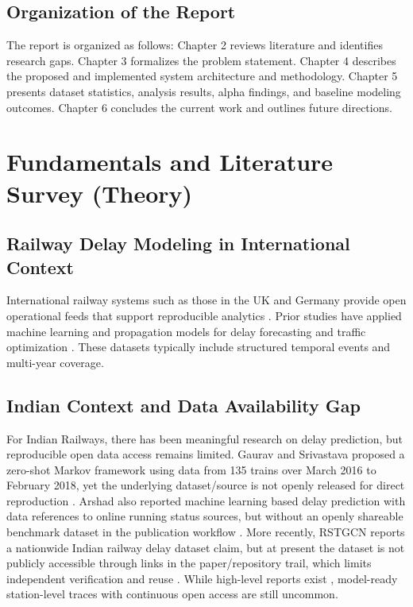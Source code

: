 \documentclass[12pt,a4paper]{report}
\begin{document}
\section{Organization of the Report}
The report is organized as follows: Chapter 2 reviews literature and identifies research gaps. Chapter 3 formalizes the problem statement. Chapter 4 describes the proposed and implemented system architecture and methodology. Chapter 5 presents dataset statistics, analysis results, alpha findings, and baseline modeling outcomes. Chapter 6 concludes the current work and outlines future directions.

\chapter{Fundamentals and Literature Survey (Theory)}

\section{Railway Delay Modeling in International Context}
International railway systems such as those in the UK and Germany provide open operational feeds that support reproducible analytics \cite{uk_rail_data,german_rail_data}. Prior studies have applied machine learning and propagation models for delay forecasting and traffic optimization \cite{oneto2018train,flier2009delay,goverde2010railway}. These datasets typically include structured temporal events and multi-year coverage.

\section{Indian Context and Data Availability Gap}
For Indian Railways, there has been meaningful research on delay prediction, but reproducible open data access remains limited. Gaurav and Srivastava proposed a zero-shot Markov framework using data from 135 trains over March 2016 to February 2018, yet the underlying dataset/source is not openly released for direct reproduction \cite{gaurav2018zeroshot}. Arshad also reported machine learning based delay prediction with data references to online running status sources, but without an openly shareable benchmark dataset in the publication workflow \cite{arshad2019prediction}. More recently, RSTGCN reports a nationwide Indian railway delay dataset claim, but at present the dataset is not publicly accessible through links in the paper/repository trail, which limits independent verification and reuse \cite{chowdhury2025rstgcn}. While high-level reports exist \cite{indian_railways_stats}, model-ready station-level traces with continuous open access are still uncommon.
\end{document}

